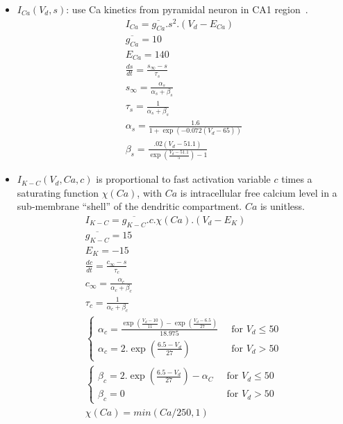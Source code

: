 \begin{itemize}
\item $I_{Ca}(V_d,s)$: use Ca kinetics from pyramidal neuron in CA1
  region~\citep{kay1987cca}.
  \begin{eqnarray*}
    I_{Ca} = \overline{g_{Ca}}.s^2.(V_d-E_{Ca}) \\
    \overline{g_{Ca}} = 10 \\
    E_{Ca} = 140 \\
\frac{ds}{dt} = \frac{s_\infty-s}{\tau_s} \\
s_\infty = \frac{\alpha_s}{\alpha_s+\beta_s} \\
\tau_s =  \frac{1}{\alpha_s+\beta_s} \\ 
\alpha_s = \frac{1.6}{1+\exp(-0.072(V_d-65))} \\
\beta_s = \frac{.02(V_d-51.1)}{\exp(\frac{V_d-51.1}{5})-1}
  \end{eqnarray*}
\item $I_{K-C}(V_d,Ca,c)$ is proportional to fast activation variable
  $c$ times a saturating function $\chi(Ca)$, with $Ca$ is
  intracellular free calcium level in a sub-membrane ``shell'' of the
  dendritic compartment. $Ca$ is unitless.
  \begin{eqnarray*}
    I_{K-C} = \overline{g_{K-C}}. c.\chi(Ca).(V_d-E_K)\\
    \overline{g_{K-C}} = 15\\
    E_{K} = -15 \\
    \frac{dc}{dt} = \frac{c_\infty-s}{\tau_c} \\
    c_\infty = \frac{\alpha_c}{\alpha_c+\beta_c} \\
    \tau_c =  \frac{1}{\alpha_c+\beta_c} \\ 
   \left\{
       \begin{array}{lc}
         \alpha_c =
         \frac{\exp(\frac{V_d-10}{11})-\exp(\frac{V_d-6.5}{27})}{18.975}&\;\;
         \text{for } V_d\le 50 \\
         \alpha_c = 2.\exp(\frac{6.5-V_d}{27})& \;\; \text{for } V_d > 50 
       \end{array}\right.\\
     \left\{
         \begin{array}{lc}
           \beta_c = 2.\exp(\frac{6.5-V_d}{27}) - \alpha_C
           &\;\;
           \text{for } V_d\le 50 \\
           \beta_c = 0& \;\; \text{for } V_d > 50 
         \end{array}\right. \\
       \chi(Ca) = min(Ca/250,1)
  \end{eqnarray*}


\end{itemize}
